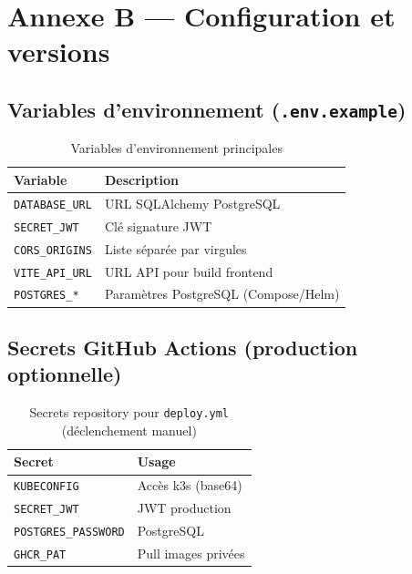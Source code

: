 \chapter{Annexe B — Configuration et versions}
\label{ann:config}

\section{Variables d'environnement (\texttt{.env.example})}

\begin{table}[htbp]
  \centering
  \caption{Variables d'environnement principales}
  \small
  \begin{tabular}{@{}lp{9cm}@{}}
    \toprule
    \textbf{Variable} & \textbf{Description} \\
    \midrule
    \texttt{DATABASE\_URL} & URL SQLAlchemy PostgreSQL \\
    \texttt{SECRET\_JWT} & Clé signature JWT \\
    \texttt{CORS\_ORIGINS} & Liste séparée par virgules \\
    \texttt{VITE\_API\_URL} & URL API pour build frontend \\
    \texttt{POSTGRES\_*} & Paramètres PostgreSQL (Compose/Helm) \\
    \bottomrule
  \end{tabular}
\end{table}

\section{Secrets GitHub Actions (production optionnelle)}

\begin{table}[htbp]
  \centering
  \caption{Secrets repository pour \texttt{deploy.yml} (déclenchement manuel)}
  \small
  \begin{tabular}{@{}lp{8cm}@{}}
    \toprule
    \textbf{Secret} & \textbf{Usage} \\
    \midrule
    \texttt{KUBECONFIG} & Accès k3s (base64) \\
    \texttt{SECRET\_JWT} & JWT production \\
    \texttt{POSTGRES\_PASSWORD} & PostgreSQL \\
    \texttt{GHCR\_PAT} & Pull images privées \\
    \bottomrule
  \end{tabular}
\end{table}

